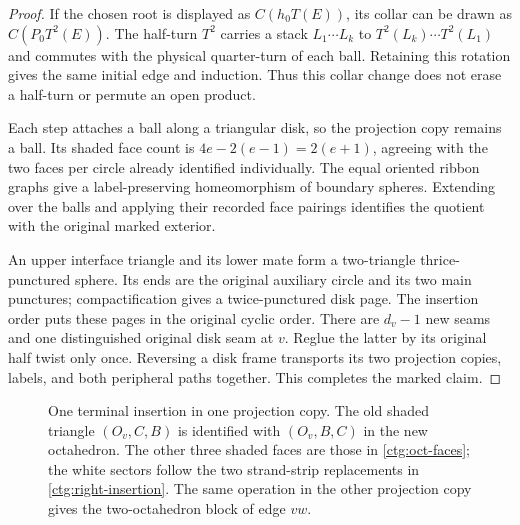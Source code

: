 \documentclass[11pt]{article}
\numberwithin{equation}{section}
\theoremstyle{definition}
\theoremstyle{remark}
\begin{document}
\begin{proof}
If the chosen root is displayed as $C(h_0T(E))$, its collar can be
drawn as $C(P_0T^2(E))$. The half-turn $T^2$ carries a stack
$L_1\cdots L_k$ to $T^2(L_k)\cdots T^2(L_1)$ and commutes with the
physical quarter-turn of each ball. Retaining this rotation gives the
same initial edge and induction. Thus this collar change does not
erase a half-turn or permute an open product.

Each step attaches a ball along a triangular disk, so the projection
copy remains a ball. Its shaded face count is
$4e-2(e-1)=2(e+1)$, agreeing with the two faces per circle already
identified individually. The equal oriented ribbon graphs give a
label-preserving homeomorphism of boundary spheres. Extending over
the balls and applying their recorded face pairings identifies the
quotient with the original marked exterior.

An upper interface triangle and its lower mate form a two-triangle
thrice-punctured sphere. Its ends are the original auxiliary circle
and its two main punctures; compactification gives a twice-punctured
disk page. The insertion order puts these pages in the original cyclic
order. There are $d_v-1$ new seams and one distinguished original disk
seam at $v$. Reglue the latter by its original half twist only once.
Reversing a disk frame transports its two projection copies, labels,
and both peripheral paths together. This completes the marked claim.
\end{proof}

\begin{figure}[t]
\centering

\caption{One terminal insertion in one projection copy. The old
shaded triangle $(O_v,C,B)$ is identified with $(O_v,B,C)$ in the new
octahedron. The other three shaded faces are those in
\eqref{ctg:oct-faces}; the white sectors follow the two strand-strip
replacements in \eqref{ctg:right-insertion}. The same operation in the
other projection copy gives the two-octahedron block of edge $vw$.}
\label{ctg:attachment-figure}
\end{figure}
\end{document}
